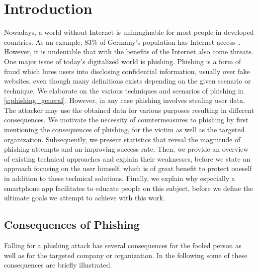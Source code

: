 \section{Introduction}
\label{s:introduction}

Nowadays, a world without Internet is unimaginable for most people in developed countries.
As an example, 83\% of Germany's population has Internet access~\cite{globalfinance2012internetusage}. 
However, it is undeniable that with the benefits of the Internet also come threats. 
One major issue of today's digitalized world is phishing. 
Phishing is a form of fraud which lures users into disclosing confidential information, usually over fake websites, even though many definitions exists depending on the given scenario or technique.
We elaborate on the various techniques and scenarios of phishing in \autoref{s:phishing_general}. 
However, in any case phishing involves stealing user data.
The attacker may use the obtained data for various purposes resulting in different consequences.
We motivate the necessity of countermeasures to phishing by first mentioning the consequences of phishing, for the victim as well as the targeted organization. 
Subsequently, we present statistics that reveal the magnitude of phishing attempts and an improving success rate. 
Then, we provide an overview of existing technical approaches and explain their weaknesses, before we state an approach focusing on the user himself, which is of great benefit to protect oneself in addition to these technical solutions. 
Finally, we explain why especially a smartphone app facilitates to educate people on this subject, before we define the ultimate goals we attempt to achieve with this work.

\subsection{Consequences of Phishing}
Falling for a phishing attack has several consequences for the fooled person as well as for the targeted company or organization.
In the following some of these consequences are briefly illustrated.


